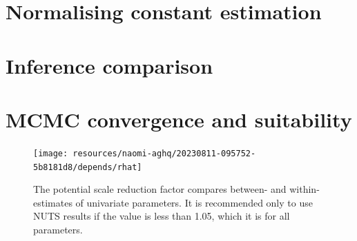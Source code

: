 \documentclass[a4paper, nobind]{templates/ociamthesis}
\newcommand*{\bibtitle}{Works Cited}
\begin{document}
\hypertarget{normalising-constant-estimation}{%
\section{Normalising constant estimation}\label{normalising-constant-estimation}}

\hypertarget{inference-comparison-1}{%
\section{Inference comparison}\label{inference-comparison-1}}

\hypertarget{mcmc-convergence-and-suitability}{%
\section{MCMC convergence and suitability}\label{mcmc-convergence-and-suitability}}

\begin{figure}
\texttt{[image: resources/naomi-aghq/20230811-095752-5b8181d8/depends/rhat]} \caption{The potential scale reduction factor compares between- and within- estimates of univariate parameters. It is recommended only to use NUTS results if the value is less than 1.05, which it is for all parameters.}\label{fig:rhat}
\end{figure}




\setlength{\baselineskip}{0pt} %

{\renewcommand*\MakeUppercase[1]{#1}%
\printbibliography[heading=bibintoc,title={\bibtitle}]}
\end{document}
